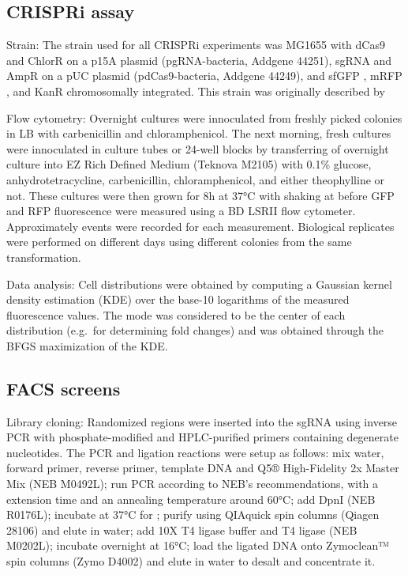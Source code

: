 \documentclass[10pt,oneside]{article}
\begin{document}
\subsection{CRISPRi assay}

Strain: The strain used for all CRISPRi experiments was \ecoli{} MG1655 with dCas9 and ChlorR on a p15A plasmid (pgRNA-bacteria, Addgene 44251), sgRNA and AmpR on a pUC plasmid (pdCas9-bacteria, Addgene 44249), and sfGFP \autocite{pedelacq2006}, mRFP \autocite{campbell2002}, and KanR chromosomally integrated.  This strain was originally described by 

Flow cytometry: Overnight cultures were innoculated from freshly picked colonies in  LB with  carbenicillin and  chloramphenicol.  The next morning, fresh cultures were innoculated in  culture tubes or 24-well blocks by transferring  of overnight culture into  EZ Rich Defined Medium (Teknova M2105) with 0.1\% glucose,  an\-hydro\-tetra\-cycline,  carbenicillin,  chloramphenicol, and either  theophylline or not.  These cultures were then grown for 8h at 37°C with shaking at  before GFP and RFP fluorescence were measured using a BD LSRII flow cytometer.  Approximately \unit[10,000]{events} were recorded for each measurement.  Biological replicates were performed on different days using different colonies from the same transformation.

Data analysis: Cell distributions were obtained by computing a Gaussian kernel density estimation (KDE) over the base-10 logarithms of the measured fluorescence values.  The mode was considered to be the center of each distribution (e.g.\ for determining fold changes) and was obtained through the BFGS maximization of the KDE.

\subsection{FACS screens}

Library cloning: Randomized regions were inserted into the sgRNA using inverse PCR with phosphate-modified and HPLC-purified primers containing degenerate nucleotides.  The PCR and ligation reactions were setup as follows: mix  water,   forward primer,   reverse primer,   template DNA and  Q5® High-Fidelity 2x Master Mix (NEB M0492L); run PCR according to NEB's recommendations, with a  extension time and an annealing temperature around 60°C; add   DpnI (NEB R0176L); incubate at 37°C for ; purify using QIAquick spin columns (Qiagen 28106) and elute in  water; add  10X T4 ligase buffer and   T4 ligase (NEB M0202L); incubate overnight at 16°C; load the ligated DNA onto Zymoclean™ spin columns (Zymo D4002) and elute in  water to desalt and concentrate it.
\end{document}
